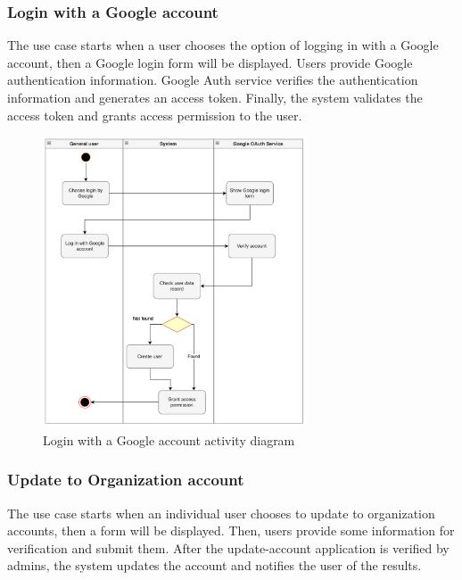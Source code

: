 \subsubsection{Login with a Google account}

The use case starts when a user chooses the option of logging in with a Google account, then a Google login form will be displayed. Users provide Google authentication information. Google Auth service verifies the authentication information and generates an access token. Finally, the system validates the access token and grants access permission to the user.

\begin{figure}[H]
  \centering
  \includegraphics[width=0.7\textwidth]{Figures/login_gg.png}
  \caption{Login with a Google account activity diagram}
  \label{fig:login-google}
\end{figure}

\subsubsection{Update to Organization account}

The use case starts when an individual user chooses to update to organization accounts, then a form will be displayed. Then, users provide some information for verification and submit them. After the update-account application is verified by admins, the system updates the account and notifies the user of the results.

